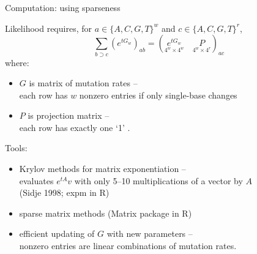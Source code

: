 \documentclass[smaller]{beamer}
\begin{document}
\begin{frame}{Computation: using sparseness}

  Likelihood requires, for $a \in \{A,C,G,T\}^w$ and $c \in \{A,C,G,T\}^r$,
  \[
  \sum_{b \supset c} \left( e^{tG_w} \right)_{ab} = ( \underset{\scriptstyle 4^w \times 4^w}{e^{tG_w}} \quad  \underset{\scriptstyle 4^w \times 4^r}{P} )_{ac} 
  \]
  where:
  \begin{itemize}
    \item $G$ is matrix of mutation rates --\\
      each row has $w$ nonzero entries if only single-base changes
    \item $P$ is projection matrix --\\
      each row has exactly one `1' .
  \end{itemize}

  {\struct Tools:} 
  \begin{itemize}

    \item Krylov methods for matrix exponentiation --\\
      evaluates $e^{tA} v$ with only 5--10 multiplications of a vector by $A$ \\
      {\aside (Sidje 1998; expm in R)}

    \item sparse matrix methods 
      {\aside (Matrix package in R)}

    \item efficient updating of $G$ with new parameters --\\
      nonzero entries are linear combinations of mutation rates.
    
  \end{itemize}

\end{frame}
\end{document}
